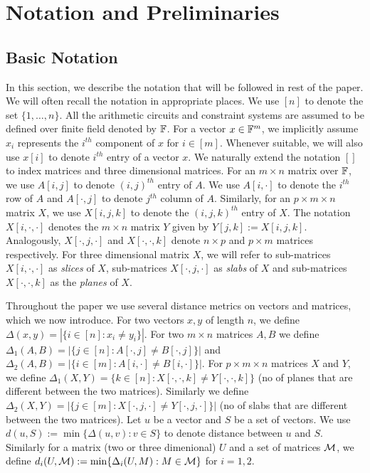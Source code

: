 \section{Notation and Preliminaries}\label{sec:prelims}
\subsection{Basic Notation}\label{sec:basicnotation}
In this section, we describe the notation that will be followed in rest of the
paper. We will often recall the notation in appropriate places. 
We use $[n]$ to
denote the set $\{1,\ldots,n\}$. All the arithmetic circuits and constraint
systems are assumed to be defined over finite field denoted by $\mathbb{F}$. For a
vector $x\in \mathbb{F}^m$, we implicitly assume $x_i$ represents the $i^{th}$
component of $x$ for $i\in [m]$. Whenever suitable, we will also use $x[i]$ to
denote $i^{th}$ entry of a vector $x$. We naturally extend the notation $[]$ to
index matrices and three dimensional matrices. For an $m\times n$ matrix over
$\mathbb{F}$, we use $A[i,j]$ to denote $(i,j)^{th}$ entry of $A$. We use $A[i,\cdot]$
to denote the $i^{th}$ row of $A$ and $A[\cdot,j]$ to denote $j^{th}$ column of
$A$. Similarly, for an $p\times m\times n$  matrix $X$, we use $X[i,j,k]$ to
denote the $(i,j,k)^{th}$ entry of $X$. The notation $X[i,\cdot,\cdot]$ denotes
the $m\times n$ matrix $Y$ given by $Y[j,k] := X[i,j,k]$. 
Analogously,
$X[\cdot,j,\cdot]$ and $X[\cdot,\cdot,k]$ denote $n\times p$ and $p\times m$
matrices respectively. For three dimensional
matrix $X$, we will refer to sub-matrices $X[i,\cdot,\cdot]$ as {\em slices} of
$X$, sub-matrices $X[\cdot,j,\cdot]$ as {\em slabs}  of $X$ and sub-matrices $X[\cdot,\cdot,k]$ as the {\em planes} of $X$. 

Throughout the paper we use several distance metrics on vectors and matrices,
which we now introduce. For two vectors $x,y$ of length $n$, we define
$\Delta(x,y)=|\{i\in [n]: x_i\neq y_i\}|$. For two $m\times n$ matrices $A,B$ we
define $\Delta_1(A,B)=|\{j\in [n]: A[\cdot,j]\neq B[\cdot,j]\}|$ and
$\Delta_2(A,B)=|\{i\in [m]: A[i,\cdot]\neq B[i,\cdot]\}|$. For $p\times m\times
n$ matrices $X$ and $Y$, we define $\Delta_1(X,Y)=\{k\in
[n]:X[\cdot,\cdot,k]\neq Y[\cdot,\cdot,k]\}$ (no of planes that are different between the two matrices). Similarly we define $\Delta_2(X,Y)
= |\{j\in [m]: X[\cdot,j,\cdot]\neq Y[\cdot,j,\cdot]\}|$  (no of slabs that are different between the two matrices). Let $u$ be a vector
and $S$ be a set of vectors. We use $d(u,S) := \min\{\Delta(u,v):v\in S\}$ to
denote distance between $u$ and $S$. Similarly for a matrix (two or three
dimenional) $U$ and a set of matrices $\mathcal{M}$, we define $d_i(U,\mathcal{M}) :=
\min\{\Delta_i(U,M): M\in \mathcal{M}\}$ for $i=1,2$.

